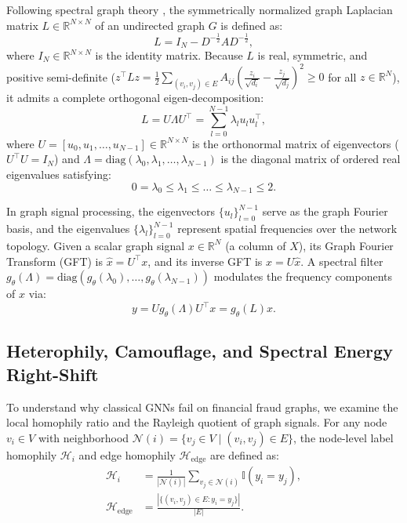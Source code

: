 \documentclass[10pt,a4paper,twocolumn]{article}
\begin{document}
Following spectral graph theory \cite{ref33}, the symmetrically normalized graph Laplacian matrix $L \in \mathbb{R}^{N \times N}$ of an undirected graph $G$ is defined as:
\begin{equation}
  L = I_N - D^{-\frac{1}{2}} A D^{-\frac{1}{2}},
\end{equation}
where $I_N \in \mathbb{R}^{N \times N}$ is the identity matrix. Because $L$ is real, symmetric, and positive semi-definite ($z^\top L z = \frac{1}{2}\sum_{(v_i, v_j) \in E} A_{ij}\left(\frac{z_i}{\sqrt{d_i}} - \frac{z_j}{\sqrt{d_j}}\right)^2 \ge 0$ for all $z \in \mathbb{R}^N$), it admits a complete orthogonal eigen-decomposition:
\begin{equation}
  L = U \Lambda U^\top = \sum_{l=0}^{N-1} \lambda_l u_l u_l^\top,
\end{equation}
where $U = [u_0, u_1, \dots, u_{N-1}] \in \mathbb{R}^{N \times N}$ is the orthonormal matrix of eigenvectors ($U^\top U = I_N$) and $\Lambda = \text{diag}(\lambda_0, \lambda_1, \dots, \lambda_{N-1})$ is the diagonal matrix of ordered real eigenvalues satisfying:
\begin{equation}
  0 = \lambda_0 \le \lambda_1 \le \dots \le \lambda_{N-1} \le 2.
\end{equation}

In graph signal processing, the eigenvectors $\{u_l\}_{l=0}^{N-1}$ serve as the graph Fourier basis, and the eigenvalues $\{\lambda_l\}_{l=0}^{N-1}$ represent spatial frequencies over the network topology. Given a scalar graph signal $x \in \mathbb{R}^N$ (a column of $X$), its Graph Fourier Transform (GFT) is $\hat{x} = U^\top x$, and its inverse GFT is $x = U\hat{x}$. A spectral filter $g_\theta(\Lambda) = \text{diag}(g_\theta(\lambda_0), \dots, g_\theta(\lambda_{N-1}))$ modulates the frequency components of $x$ via:
\begin{equation}
  y = U g_\theta(\Lambda) U^\top x = g_\theta(L)x.
\end{equation}

\subsection{Heterophily, Camouflage, and Spectral Energy Right-Shift}

To understand why classical GNNs fail on financial fraud graphs, we examine the local homophily ratio and the Rayleigh quotient of graph signals. For any node $v_i \in V$ with neighborhood $\mathcal{N}(i) = \{v_j \in V \mid (v_i, v_j) \in E\}$, the node-level label homophily $\mathscr{H}_i$ and edge homophily $\mathscr{H}_{\text{edge}}$ are defined as:
\begin{equation}
  \begin{aligned}
    \mathscr{H}_i &= \frac{1}{|\mathcal{N}(i)|} \sum_{v_j \in \mathcal{N}(i)} \mathbb{I}(y_i = y_j), \\
    \mathscr{H}_{\text{edge}} &= \frac{|\{(v_i, v_j) \in E : y_i = y_j\}|}{|E|}.
  \end{aligned}
\end{equation}
\end{document}
